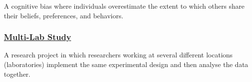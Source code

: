 \documentclass[
  letterpaper,
]{book}
\begin{document}
A cognitive bias where individuals overestimate the extent to which
others share their beliefs, preferences, and behaviors.

\subsubsection*{\texorpdfstring{\hyperref[def-multilabstudy]{Multi-Lab
Study}}{Multi-Lab Study}}\label{multi-lab-study}

A research project in which researchers working at several different
locations (laboratories) implement the same experimental design and then
analyse the data together.


\backmatter
\end{document}
